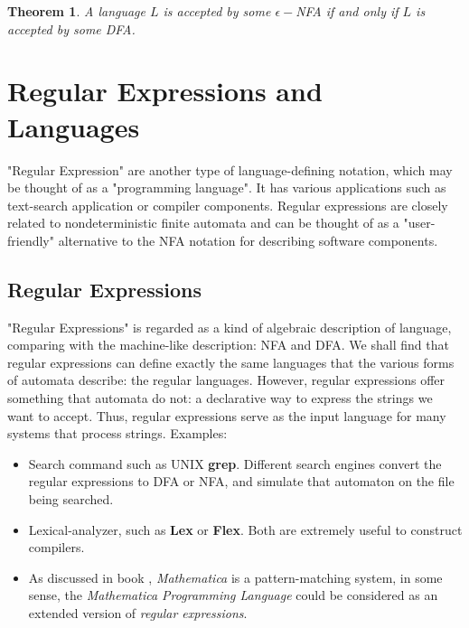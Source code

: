 \documentclass[12pt,reqno]{amsart}
\newtheorem{thm}{Theorem}[section]
\begin{document}
\begin{thm}
	A language $L$ is accepted by some $\epsilon-$NFA if and only if $L$ is accepted by some DFA.
\end{thm}




\section{Regular Expressions and Languages}
"Regular Expression" are another type of language-defining notation, which may be thought of as a "programming language". It has various applications such as text-search application or compiler components. Regular expressions are closely related to nondeterministic finite automata and can be thought of as a "user-friendly" alternative to the NFA notation for describing software components.

\subsection{Regular Expressions}
"Regular Expressions" is regarded as a kind of algebraic description of language, comparing with the machine-like description: NFA and DFA.
We shall find that regular expressions can define exactly the same languages that the various forms of automata describe: the regular languages. However, regular expressions offer something that automata do not: a declarative way to express the strings we want to accept. Thus, regular expressions serve as the input language for many systems that process strings. Examples:
	\begin{itemize}
	\item Search command such as UNIX \textbf{grep}. Different search engines convert the regular expressions to DFA or NFA, and simulate that automaton on the file being searched.
	\item Lexical-analyzer, such as \textbf{Lex} or \textbf{Flex}. Both are extremely useful to construct compilers.
	\item As discussed in book \cite{book2}, \textit{Mathematica} is a pattern-matching system, in some sense, the \textit{Mathematica Programming Language} could be considered as an extended version of \textit{regular expressions}.
	\end{itemize}
	
\end{document}
